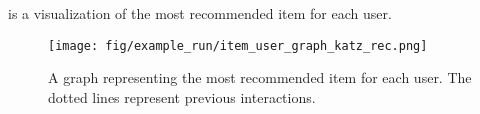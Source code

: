  is a visualization of the most recommended item for each user.

\begin{figure}[h!]
    \centering
    \texttt{[image: fig/example\_run/item\_user\_graph\_katz\_rec.png]}
    \caption{A graph representing the most recommended item for each user. The dotted lines represent previous interactions.}
    \label{fig:ex_graph_katz_rec}
\end{figure}

\FloatBarrier

